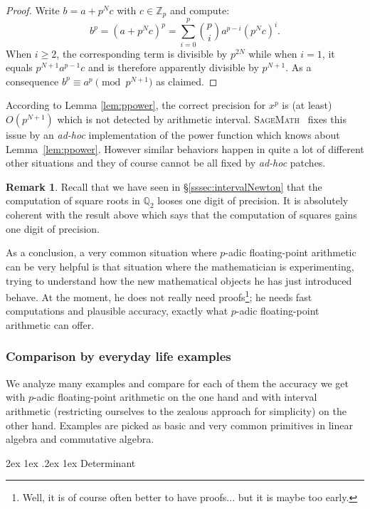 \documentclass[11pt]{article}
\makeatletter
\numberwithin{equation}{section}
\numberwithin{figure}{section}
\renewcommand\paragraph{\@startsection{paragraph}{4}{\z@}%
                                    {2ex \@plus1ex \@minus.2ex}%
                                    {1ex}%
                                    {\normalfont\normalsize\bfseries}}
\renewcommand{\geq}{\geqslant}
\theoremstyle{definition}
\newtheorem{rem}[theo]{Remark}
\newcommand{\Z}{\mathbb Z}
\newcommand{\Zp}{\Z_p}
\newcommand{\Q}{\mathbb Q}
\newcommand{\sage}{\textsc{SageMath}~\cite{sage}\xspace}
\makeatother
\begin{document}
\begin{proof}
Write $b = a + p^Nc$ with $c \in \Zp$ and compute:
$$b^p = (a + p^Nc)^p = \sum_{i=0}^p \binom p i a^{p-i} (p^Nc)^{i}.$$
When $i \geq 2$, the corresponding term is divisible by $p^{2N}$ while 
when $i=1$, it equals $p^{N+1} a^{p-1} c$ and is therefore apparently
divisible by $p^{N+1}$. As a consequence $b^p \equiv a^p \pmod{p^{N+1}}$
as claimed.
\end{proof}

\noindent
According to Lemma \ref{lem:ppower}, the correct precision for $x^p$ is (at least) 
$O(p^{N+1})$ which is not detected by arithmetic interval. \sage fixes
this issue by an \emph{ad-hoc} implementation of the power function 
which knows about Lemma~\ref{lem:ppower}. However similar behaviors 
happen in quite a lot of different other situations and they of course 
cannot be all fixed by \emph{ad-hoc} patches.

\begin{rem}
Recall that we have seen in \S \ref{sssec:intervalNewton} that the 
computation of square roots in $\Q_2$ looses one digit of precision. 
It is absolutely coherent with the result above which says that the 
computation of squares gains one digit of precision.
\end{rem}

As a conclusion, a very common situation where $p$-adic floating-point 
arithmetic can be very helpful is that situation where the mathematician 
is experimenting, trying to understand how the new mathematical 
objects he has just introduced behave. At the moment, he does not really need 
proofs\footnote{Well, it is of course often better to have proofs... but 
it is maybe too early.}; he needs fast computations and plausible 
accuracy, exactly what $p$-adic floating-point arithmetic can offer.

\subsubsection{Comparison by everyday life examples}
\label{sssec:compexamples}

We analyze many examples and compare for each of them the accuracy we 
get with $p$-adic floating-point arithmetic on the one hand and with interval 
arithmetic (restricting ourselves to the zealous approach for 
simplicity) on the other hand. Examples are picked as basic and very
common primitives in linear algebra and commutative algebra.

\paragraph{Determinant}
\end{document}
